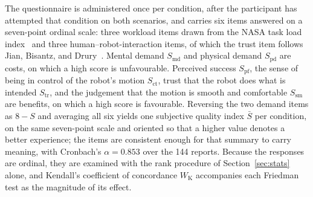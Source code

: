 The questionnaire is administered once per condition, after the participant has attempted that condition on both scenarios, and carries six items answered on a seven-point ordinal scale: three workload items drawn from the NASA task load index~\cite{hart1988nasatlx} and three human--robot-interaction items, of which the trust item follows Jian, Bisantz, and Drury~\cite{jian2000trust}. Mental demand $S_{\mathrm{md}}$ and physical demand $S_{\mathrm{pd}}$ are costs, on which a high score is unfavourable. Perceived success $S_{\mathrm{pf}}$, the sense of being in control of the robot's motion $S_{\mathrm{ct}}$, trust that the robot does what is intended $S_{\mathrm{tr}}$, and the judgement that the motion is smooth and comfortable $S_{\mathrm{sm}}$ are benefits, on which a high score is favourable. Reversing the two demand items as $8-S$ and averaging all six yields one subjective quality index $\bar{S}$ per condition, on the same seven-point scale and oriented so that a higher value denotes a better experience; the items are consistent enough for that summary to carry meaning, with Cronbach's $\alpha = 0.853$ over the 144 reports. Because the responses are ordinal, they are examined with the rank procedure of Section~\ref{sec:stats} alone, and Kendall's coefficient of concordance $W_{\mathrm{K}}$ accompanies each Friedman test as the magnitude of its effect.

